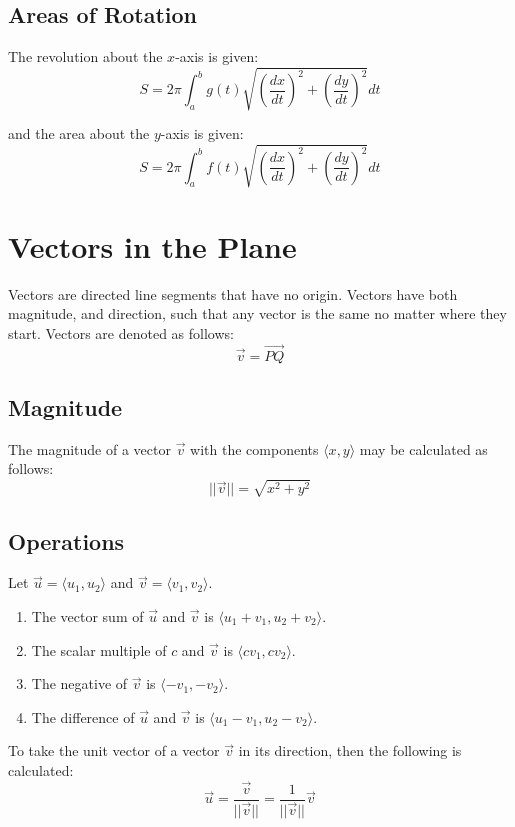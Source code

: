 \subsection{Areas of Rotation}
The revolution about the $x$-axis is given:
\begin{equation}
  S=2\pi\int_a^b
  g(t)\sqrt{\left(\frac{dx}{dt}\right)^2+\left(\frac{dy}{dt}\right)^2} dt
\end{equation}

and the area about the $y$-axis is given:
\begin{equation}
  S=2\pi\int_a^b
  f(t)\sqrt{\left(\frac{dx}{dt}\right)^2+\left(\frac{dy}{dt}\right)^2} dt
\end{equation}

\section{Vectors in the Plane}
Vectors are directed line segments that have no origin. Vectors have both
magnitude, and direction, such that any vector is the same no matter where they
start. Vectors are denoted as follows:
$$\vec{v}=\vec{PQ}$$

\subsection{Magnitude}
The magnitude of a vector $\vec{v}$ with the components $\langle x,y\rangle$ may
be calculated as follows:
\begin{equation}
  ||\vec{v}||=\sqrt{x^2+y^2}
\end{equation}

\subsection{Operations}
Let $\vec{u}=\langle u_1,u_2\rangle$ and $\vec{v}=\langle v_1,v_2\rangle$.
\begin{enumerate}
  \item The vector sum of $\vec{u}$ and $\vec{v}$ is $\langle u_1+v_1, u_2+v_2
    \rangle$.
  \item The scalar multiple of $c$ and $\vec{v}$ is $\langle cv_1, cv_2
    \rangle$.
  \item The negative of $\vec{v}$ is $\langle -v_1, -v_2 \rangle$.
  \item The difference of $\vec{u}$ and $\vec{v}$ is $\langle u_1-v_1, u_2-v_2
    \rangle$.
\end{enumerate}

To take the unit vector of a vector $\vec{v}$ in its direction, then the
following is calculated:
\begin{equation}
  \vec{u}=\frac{\vec{v}}{||\vec{v}||}=\frac{1}{||\vec{v}||}\vec{v}
\end{equation}

